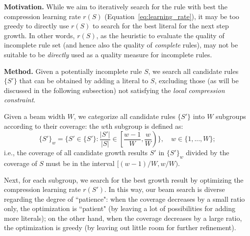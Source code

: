 \noindent \textbf{Motivation.} While we aim to iteratively search for the rule with best the compression learning rate $r(S)$ (Equation~\ref{eq:learning_rate}), it may be too greedy to directly use $r(S)$ to search for the best literal for the next step growth. In other words, $r(S)$, as the heuristic to evaluate the quality of incomplete rule set (and hence also the quality of \emph{complete} rules), may not be suitable to be \emph{directly} used as a quality measure for incomplete rules. 

\noindent \textbf{Method.} Given a potentially incomplete rule $S$, we search all candidate rules $\{S'\}$ that can be obtained by adding a literal to $S$, excluding those (as will be discussed in the following subsection) not satisfying the \emph{local compression constraint}. 

Given a beam width $W$, we categorize all candidate rules $\{S'\}$ into $W$ subgroups according to their coverage: the $w$th subgroup is defined as: 
\begin{equation}
	\{S'\}_w = \{S' \in 	\{S'\}: \frac{|S'|}{|S|} \in \left[\frac{w-1}{W}, \frac{w}{W}\right) \}, \,\,\,\,\,\, w \in \{1, ..., W\}; 
\end{equation}
i.e., the coverage of all candidate growth results $S'$ in $\{S'\}_w$ divided by the coverage of $S$ must be in the interval $[(w-1)/W, w/W)$. 

Next, for each subgroup, we search for the best growth result by optimizing the compression learning rate $r(S')$. In this way, our beam search is diverse regarding the degree of ``patience": when the coverage decreases by a small ratio only, the optimization is ``patient" (by leaving a lot of possibilities for adding more literals); on the other hand, when the coverage decreases by a large ratio, the optimization is greedy (by leaving out little room for further refinement). 

